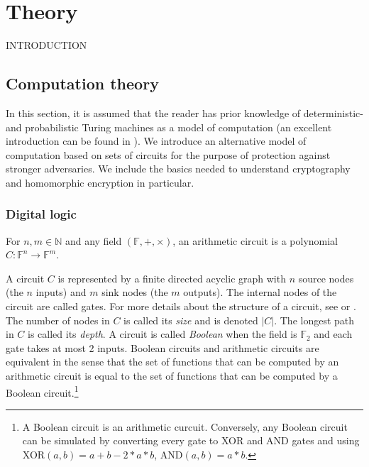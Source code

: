 \chapter{Theory}

INTRODUCTION

\section{Computation theory}
 In this section, it is assumed that the reader has prior knowledge of deterministic- and probabilistic Turing machines as a model of computation (an excellent introduction can be found in \cite{Gol01}). We introduce an alternative model of computation based on sets of circuits for the purpose of protection against stronger adversaries. We include the basics needed to understand cryptography and homomorphic encryption in particular. 

 \subsection*{Digital logic}

\begin{definition}[Circuit]
For $n, m \in \mathbb{N}$ and any field $(\mathbb{F},+,\times)$, an arithmetic circuit is a polynomial $C \colon \mathbb{F}^{n} \to \mathbb{F}^m$. 
\end{definition}

A circuit $C$ is represented by a finite directed acyclic graph with $n$ source nodes (the $n$ inputs) and $m$ sink nodes (the $m$ outputs). The internal nodes of the circuit are called gates. For more details about the structure of a circuit, see \cite{goldreich_2008} or \cite{MF21}. The number of nodes in $C$ is called its \textit{size} and is denoted $|C|$. The longest path in $C$ is called its \textit{depth}.
A circuit is called \textit{Boolean} when the field is $\mathbb{F}_2$ and each gate takes at most 2 inputs. Boolean circuits and arithmetic circuits are equivalent in the sense that the set of functions that can be computed by an arithmetic circuit is equal to the set of functions that can be computed by a Boolean circuit.\footnote{A Boolean circuit is an arithmetic curcuit. Conversely, any Boolean circuit can be simulated by converting every gate to XOR and AND gates and using XOR$(a,b) = a+b-2*a*b$, AND$(a,b) = a*b$.} 


